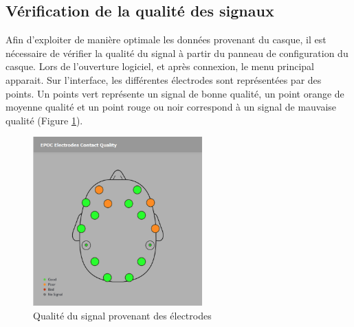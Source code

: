 \subsection {Vérification de la qualité des signaux}
\label{Subsection : 5.Vérification de la qualité des signaux}
Afin d'exploiter de manière optimale les données provenant du casque, il est nécessaire de vérifier la qualité du signal à partir du panneau de configuration du casque. Lors de l'ouverture logiciel, et après connexion, le menu principal apparait. Sur l'interface, les différentes électrodes sont représentées par des points. Un points vert représente un signal de bonne qualité, un point orange de moyenne qualité et un point rouge ou noir correspond à un signal de mauvaise qualité (Figure \ref{qualiteSignal}).
	
\begin{figure}[h]
	\centering\includegraphics[height=6.5cm]{images/emotivQuality.png}
	\caption{Qualité du signal provenant des électrodes}
	\label{qualiteSignal}
\end{figure}
	